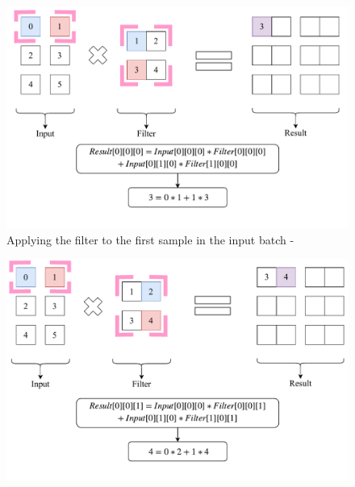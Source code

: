 \documentclass[12pt]{article}
\begin{document}
\newpage
\begin{figure}[!htbp]
\begin{center}
	\includegraphics[width=\textwidth]{firstConvSample_step1}
	\caption{Applying the filter to the first sample in the input batch - }
\end{center}
\end{figure}
\begin{figure}[!htbp]
\begin{center}
	\includegraphics[width=\textwidth]{firstConvSample_step2}
\end{center}
\end{figure}
\end{document}

